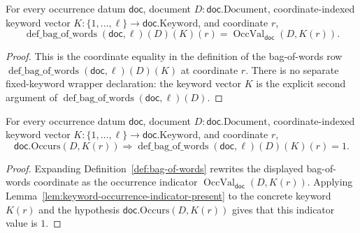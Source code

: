 \begin{lemma}
  \label{lem:bow-coordinate-indicator}
  For every occurrence datum $\mathsf{doc}$, document
  $D:\mathsf{doc}.\mathrm{Document}$, coordinate-indexed keyword vector
  $K:\{1,\ldots,\ell\}\to\mathsf{doc}.\mathrm{Keyword}$, and coordinate $r$,
  \[
    \operatorname{def\_bag\_of\_words}(\mathsf{doc},\ell)(D)(K)(r)
      =\operatorname{OccVal}_{\mathsf{doc}}(D,K(r)).
  \]
\end{lemma}
\begin{proof}
  This is the coordinate equality in the definition of
  the bag-of-words row
  $\operatorname{def\_bag\_of\_words}(\mathsf{doc},\ell)(D)(K)$ at coordinate
  $r$.  There is no separate fixed-keyword wrapper declaration: the keyword
  vector $K$ is the explicit second argument of
  $\operatorname{def\_bag\_of\_words}(\mathsf{doc},\ell)(D)$.
\end{proof}

\begin{lemma}
  \label{lem:bow-coordinate-present}
  For every occurrence datum $\mathsf{doc}$, document
  $D:\mathsf{doc}.\mathrm{Document}$, coordinate-indexed keyword vector
  $K:\{1,\ldots,\ell\}\to\mathsf{doc}.\mathrm{Keyword}$, and coordinate $r$,
  \[
    \mathsf{doc}.\mathrm{Occurs}(D,K(r))
      \Rightarrow
      \operatorname{def\_bag\_of\_words}(\mathsf{doc},\ell)(D)(K)(r)=1.
  \]
\end{lemma}
\begin{proof}
  Expanding Definition~\ref{def:bag-of-words} rewrites the displayed
  bag-of-words coordinate as the occurrence indicator
  $\operatorname{OccVal}_{\mathsf{doc}}(D,K(r))$.  Applying
  Lemma~\ref{lem:keyword-occurrence-indicator-present} to the concrete keyword
  $K(r)$ and the hypothesis $\mathsf{doc}.\mathrm{Occurs}(D,K(r))$ gives that
  this indicator value is $1$.
\end{proof}


